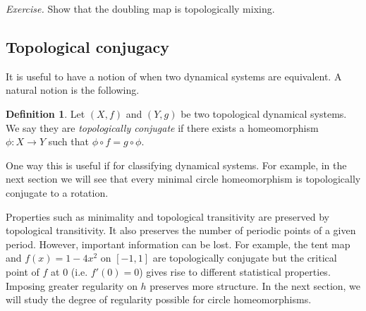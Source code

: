 \documentclass[12pt]{article}
\theoremstyle{definition}
\newtheorem{definition}[theorem]{Definition}
\theoremstyle{remark}
\begin{document}
\medskip
\noindent
{\it Exercise.}
Show that the doubling map is topologically mixing.




\subsection{Topological conjugacy}
It is useful to have a notion of when two dynamical systems are equivalent. A natural notion is the following.

\begin{definition}
Let $(X,f)$ and $(Y,g)$ be two topological dynamical systems. We say they are {\it topologically conjugate}
if there exists a homeomorphism
$\phi : X \to Y$ such that
$\phi \circ f = g \circ \phi$.
\end{definition}

One way this is useful if for classifying dynamical systems. For example, in the next section we will see that every minimal circle homeomorphism is topologically conjugate to a rotation.

Properties such as minimality and topological transitivity are preserved by topological transitivity.
It also preserves the number of periodic points of a given period.
However, important information can be lost. For example, the tent map 
and $f(x) = 1-4x^2$ on $[-1,1]$
are topologically conjugate but the critical point of $f$ at $0$ (i.e. $f'(0)=0$) gives rise to different 
statistical properties. Imposing greater regularity on $h$ preserves more structure.
In the next section, we will study the degree of regularity possible for  circle homeomorphisms.
\end{document}
